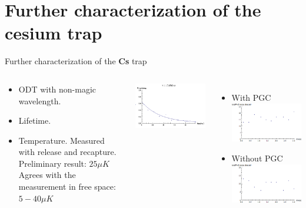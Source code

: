 \documentclass{beamer}
\begin{document}
\section{Further characterization of the cesium trap}
\begin{frame}{Further characterization of the \textbf{Cs} trap}
  \begin{columns}
    \column{5.5cm}
    \begin{block}{}
      \begin{itemize}
      \item<2->
        ODT with non-magic wavelength.
      \item<3->
        Lifetime.
      \item<5->
        Temperature. Measured with release and recapture.\\
         {
          Preliminary result: $25 \mu K$\\
          Agrees with the measurement in free space: $5-40\mu K$
        }
      \end{itemize}
    \end{block}
     {
      \includegraphics[width=5.5cm]{rnr_tweezer_fit.png}
    }
    \column{6.5cm}
     {
      \begin{itemize}
      \item
        With PGC\\
        \includegraphics[width=5.5cm]{odt_lifetime.png}
      \item
        Without PGC\\
        \includegraphics[width=5.5cm]{odt_lifetime_no_pgc.png}
      \end{itemize}
    }
  \end{columns}
\end{frame}
\end{document}

